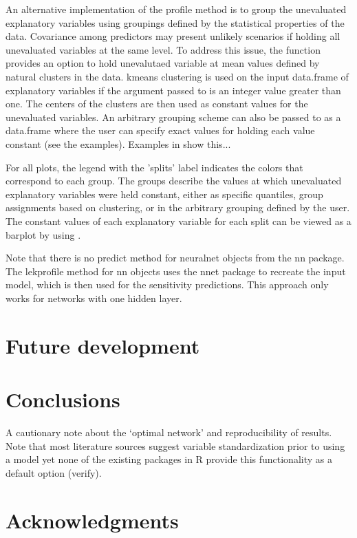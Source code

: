 \documentclass[article,shortnames]{jss}\usepackage[]{graphicx}\usepackage[]{color}
\begin{document}
An alternative implementation of the profile method is to group the unevaluated explanatory variables using groupings defined by the statistical properties of the data. Covariance among predictors may present unlikely scenarios if holding all unevaluated variables at the same level. To address this issue, the function provides an option to hold unevalutaed variable at mean values defined by natural clusters in the data. kmeans clustering is used on the input data.frame of explanatory variables if the argument passed to  is an integer value greater than one. The centers of the clusters are then used as constant values for the unevaluated variables. An arbitrary grouping scheme can also be passed to  as a data.frame where the user can specify exact values for holding each value constant (see the examples).  Examples in \citet{Beck14a} show this...

For all plots, the legend with the 'splits' label indicates the colors that correspond to each group. The groups describe the values at which unevaluated explanatory variables were held constant, either as specific quantiles, group assignments based on clustering, or in the arbitrary grouping defined by the user. The constant values of each explanatory variable for each split can be viewed as a barplot by using .

Note that there is no predict method for neuralnet objects from the nn package. The lekprofile method for nn objects uses the nnet package to recreate the input model, which is then used for the sensitivity predictions. This approach only works for networks with one hidden layer.

\section[Future development]{Future development}


\section[Conclusions]{Conclusions}

A cautionary note about the `optimal network' and reproducibility of results.  Note that most literature sources suggest variable standardization prior to using a model yet none of the existing packages in R provide this functionality as a default option (verify).    

\section[Acknowledgments]{Acknowledgments}



\end{document}
